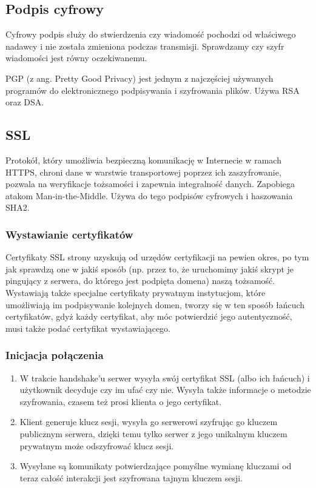 \subsection{Podpis cyfrowy}
Cyfrowy podpis służy do stwierdzenia czy wiadomość pochodzi od właściwego nadawcy i nie została zmieniona podczas transmisji. Sprawdzamy czy szyfr wiadomości jest równy oczekiwanemu.

PGP (z ang. Pretty Good Privacy) jest jednym z najczęściej używanych programów do elektronicznego podpisywania i szyfrowania plików. Używa RSA oraz DSA.

\subsection{SSL}
Protokół, który umożliwia bezpieczną komunikację w Internecie w ramach HTTPS, chroni dane w warstwie transportowej poprzez ich zaszyfrowanie, pozwala na weryfikacje tożsamości i zapewnia integralność danych. Zapobiega atakom Man-in-the-Middle. Używa do tego podpisów cyfrowych i haszowania SHA2.

\subsubsection{Wystawianie certyfikatów}
Certyfikaty SSL strony uzyskują od urzędów certyfikacji na pewien okres, po tym jak sprawdzą one w jakiś sposób (np. przez to, że uruchomimy jakiś skrypt je pingujący z serwera, do którego jest podpięta domena) naszą tożsamość. Wystawiają także specjalne certyfikaty prywatnym instytucjom, które umożliwiają im podpisywanie kolejnych domen, tworzy się w ten sposób łańcuch certyfikatów, gdyż każdy certyfikat, aby móc potwierdzić jego autentyczność, musi także podać certyfikat wystawiającego.

\subsubsection{Inicjacja połączenia}
\begin{enumerate}
	\item W trakcie handshake'u serwer wysyła swój certyfikat SSL (albo ich łańcuch) i użytkownik decyduje czy im ufać czy nie. Wysyła także informacje o metodzie szyfrowania, czasem też prosi klienta o jego certyfikat.
	\item Klient generuje klucz sesji, wysyła go serwerowi szyfrując go kluczem publicznym serwera, dzięki temu tylko serwer z jego unikalnym kluczem prywatnym może odszyfrować klucz sesji.
	\item Wysyłane są komunikaty potwierdzające pomyślne wymianę kluczami od teraz całość interakcji jest szyfrowana tajnym kluczem sesji.
\end{enumerate}

